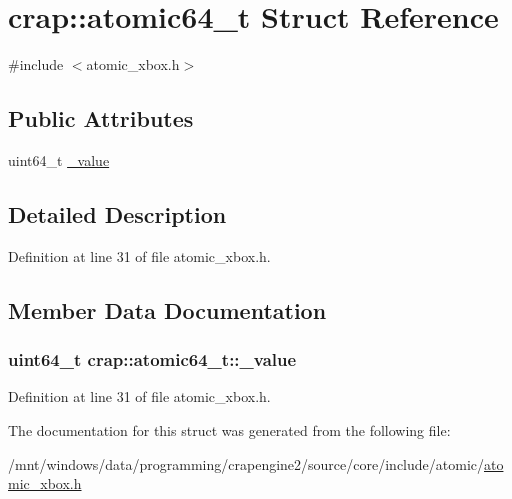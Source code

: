 \hypertarget{structcrap_1_1atomic64__t}{}\section{crap\+:\+:atomic64\+\_\+t Struct Reference}
\label{structcrap_1_1atomic64__t}


{\ttfamily \#include $<$atomic\+\_\+xbox.\+h$>$}

\subsection*{Public Attributes}
\begin{DoxyCompactItemize}
\item 
uint64\+\_\+t \hyperlink{structcrap_1_1atomic64__t_a4a7e2fa264d91c856718229e0e7d7bc7}{\+\_\+value}
\end{DoxyCompactItemize}


\subsection{Detailed Description}


Definition at line 31 of file atomic\+\_\+xbox.\+h.



\subsection{Member Data Documentation}
\hypertarget{structcrap_1_1atomic64__t_a4a7e2fa264d91c856718229e0e7d7bc7}{}
\subsubsection[{\+\_\+value}]{\setlength{\rightskip}{0pt plus 5cm}uint64\+\_\+t crap\+::atomic64\+\_\+t\+::\+\_\+value}\label{structcrap_1_1atomic64__t_a4a7e2fa264d91c856718229e0e7d7bc7}


Definition at line 31 of file atomic\+\_\+xbox.\+h.



The documentation for this struct was generated from the following file\+:\begin{DoxyCompactItemize}
\item 
/mnt/windows/data/programming/crapengine2/source/core/include/atomic/\hyperlink{atomic__xbox_8h}{atomic\+\_\+xbox.\+h}\end{DoxyCompactItemize}
